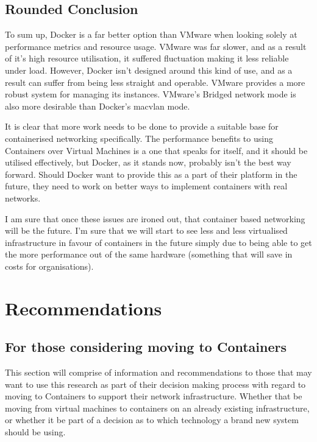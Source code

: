 \section{Rounded Conclusion}

To sum up, Docker is a far better option than VMware when looking solely at performance metrics and resource usage. VMware was far slower, and as a result of it's high resource utilisation, it suffered fluctuation making it less reliable under load. However, Docker isn't designed around this kind of use, and as a result can suffer from being less straight and operable. VMware provides a more robust system for managing its instances. VMware's Bridged network mode is also more desirable than Docker's macvlan mode. 

It is clear that more work needs to be done to provide a suitable base for containerised networking specifically. The performance benefits to using Containers over Virtual Machines is a one that speaks for itself, and it should be utilised effectively, but Docker, as it stands now, probably isn't the best way forward. Should Docker want to provide this as a part of their platform in the future, they need to work on better ways to implement containers with real networks.

I am sure that once these issues are ironed out, that container based networking will be the future. I'm sure that we will start to see less and less virtualised infrastructure in favour of containers in the future simply due to being able to get the more performance out of the same hardware (something that will save in costs for organisations).

\chapter{Recommendations}

\section{For those considering moving to Containers}
\label{sec:RecSMEs}
This section will comprise of information and recommendations to those that may want to use this research as part of their decision making process with regard to moving to Containers to support their network infrastructure. Whether that be moving from virtual machines to containers on an already existing infrastructure, or whether it be part of a decision as to which technology a brand new system should be using.

